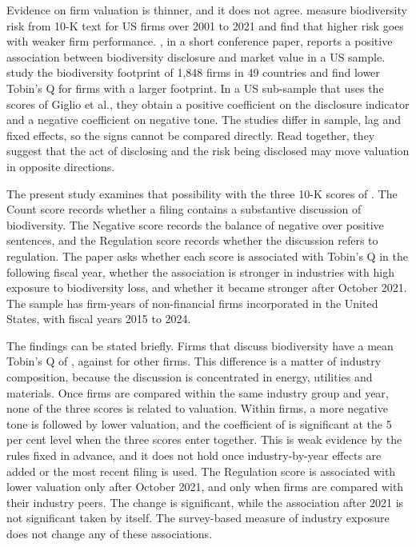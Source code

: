\documentclass[12pt,a4paper]{article}
\begin{document}
Evidence on firm valuation is thinner, and it does not agree. \citet{bach2025} measure biodiversity risk from 10-K text for US firms over 2001 to 2021 and find that higher risk goes with weaker firm performance. \citet{he2024}, in a short conference paper, reports a positive association between biodiversity disclosure and market value in a US sample. \citet{cosma2025} study the biodiversity footprint of 1,848 firms in 49 countries and find lower Tobin's Q for firms with a larger footprint. In a US sub-sample that uses the scores of Giglio et al., they obtain a positive coefficient on the disclosure indicator and a negative coefficient on negative tone. The studies differ in sample, lag and fixed effects, so the signs cannot be compared directly. Read together, they suggest that the act of disclosing and the risk being disclosed may move valuation in opposite directions.

The present study examines that possibility with the three 10-K scores of \citet{giglio2026}. The Count score records whether a filing contains a substantive discussion of biodiversity. The Negative score records the balance of negative over positive sentences, and the Regulation score records whether the discussion refers to regulation. The paper asks whether each score is associated with Tobin's Q in the following fiscal year, whether the association is stronger in industries with high exposure to biodiversity loss, and whether it became stronger after October 2021. The sample has \nFinal{} firm-years of non-financial firms incorporated in the United States, with fiscal years 2015 to 2024.

The findings can be stated briefly. Firms that discuss biodiversity have a mean Tobin's Q of \meanQOne{}, against \meanQZero{} for other firms. This difference is a matter of industry composition, because the discussion is concentrated in energy, utilities and materials. Once firms are compared within the same industry group and year, none of the three scores is related to valuation. Within firms, a more negative tone is followed by lower valuation, and the coefficient of \coefFAllNeg{} is significant at the 5 per cent level when the three scores enter together. This is weak evidence by the rules fixed in advance, and it does not hold once industry-by-year effects are added or the most recent filing is used. The Regulation score is associated with lower valuation only after October 2021, and only when firms are compared with their industry peers. The change is significant, while the association after 2021 is not significant taken by itself. The survey-based measure of industry exposure does not change any of these associations.
\end{document}
